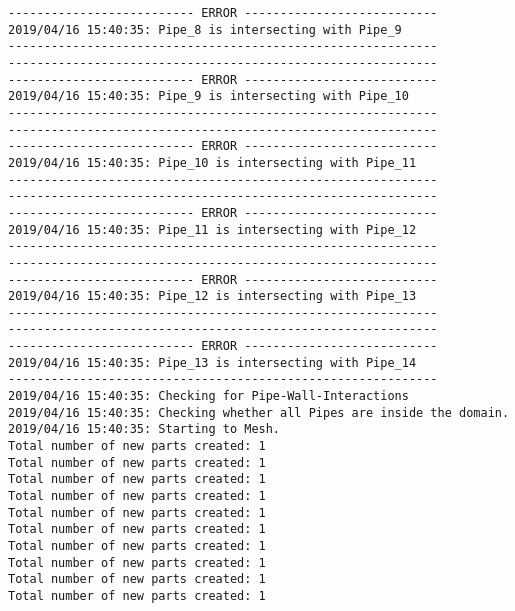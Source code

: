 \documentclass{article}
\begin{document}
{\begin{verbatim}
-------------------------- ERROR ---------------------------
2019/04/16 15:40:35: Pipe_8 is intersecting with Pipe_9
------------------------------------------------------------
------------------------------------------------------------
-------------------------- ERROR ---------------------------
2019/04/16 15:40:35: Pipe_9 is intersecting with Pipe_10
------------------------------------------------------------
------------------------------------------------------------
-------------------------- ERROR ---------------------------
2019/04/16 15:40:35: Pipe_10 is intersecting with Pipe_11
------------------------------------------------------------
------------------------------------------------------------
-------------------------- ERROR ---------------------------
2019/04/16 15:40:35: Pipe_11 is intersecting with Pipe_12
------------------------------------------------------------
------------------------------------------------------------
-------------------------- ERROR ---------------------------
2019/04/16 15:40:35: Pipe_12 is intersecting with Pipe_13
------------------------------------------------------------
------------------------------------------------------------
-------------------------- ERROR ---------------------------
2019/04/16 15:40:35: Pipe_13 is intersecting with Pipe_14
------------------------------------------------------------
2019/04/16 15:40:35: Checking for Pipe-Wall-Interactions
2019/04/16 15:40:35: Checking whether all Pipes are inside the domain.
2019/04/16 15:40:35: Starting to Mesh.
Total number of new parts created: 1
Total number of new parts created: 1
Total number of new parts created: 1
Total number of new parts created: 1
Total number of new parts created: 1
Total number of new parts created: 1
Total number of new parts created: 1
Total number of new parts created: 1
Total number of new parts created: 1
Total number of new parts created: 1
\end{verbatim}
}
\clearpage
\end{document}
